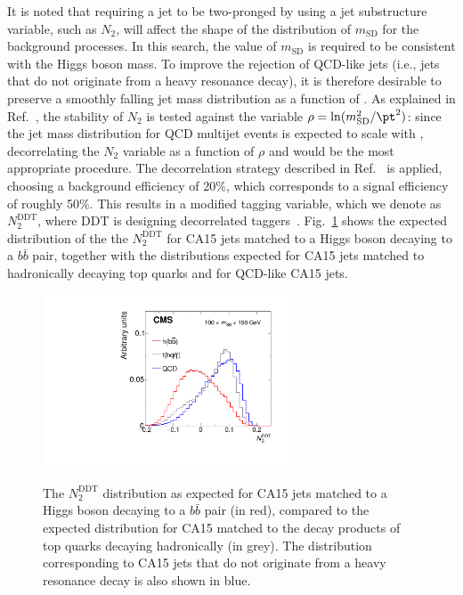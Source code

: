 It is noted that requiring a jet to be two-pronged by using a jet substructure variable,
such as $N_2$, will affect the shape of the distribution of $m_\text{SD}$ for the
background processes. In this search, the value of $m_\text{SD}$ is required to be consistent with the Higgs boson mass.
To improve the rejection of QCD-like jets (i.e., jets that
do not originate from a heavy resonance decay), it is therefore desirable to preserve a smoothly falling jet mass
distribution  as a function of \pt. As explained in
Ref.~\cite{ddt}, the stability of $N_2$ is tested against the variable
$\rho=\ln(m_{\text{SD}}^2/\pt^2)$: since the jet mass distribution for QCD multijet
events is expected to scale with \pt, decorrelating the $N_2$ variable
as a function of $\rho$ and \pt would be the most appropriate procedure. The
decorrelation strategy described in Ref.~\cite{ddt} is applied,
choosing a background efficiency of 20\%, which corresponds to a
signal efficiency of roughly 50\%. This results in a modified tagging
variable, which we denote as $N_2^\text{DDT}$, where DDT is designing decorrelated taggers~\cite{ddt}. Fig.~\ref{n2ddt} shows the expected distribution of the the $N_2^\text{DDT}$ for CA15 jets matched to a Higgs boson decaying to a $b\bar{b}$ pair, together with the distributions expected for CA15 jets matched to hadronically decaying top quarks and for QCD-like CA15 jets.
\begin{figure}
\centering
  \includegraphics[width=0.65\textwidth]{figures/ddt_N2DDT_ns.pdf} \\
\caption{The $N_2^\text{DDT}$ distribution as expected for CA15 jets matched to a Higgs boson decaying to a $b\bar{b}$ pair (in red), compared to the expected distribution for CA15 matched to the decay products of top quarks decaying hadronically (in grey). The distribution corresponding to CA15 jets that do not originate from a heavy resonance decay is also shown in blue.}
\label{n2ddt}
\end{figure}


